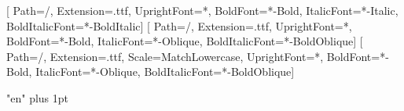 \usepackage{fontspec}
\setmainfont{DejaVuSerif}[
  Path=\fontdir/, Extension=.ttf,
  UprightFont=*, BoldFont=*-Bold, ItalicFont=*-Italic, BoldItalicFont=*-BoldItalic]
\setsansfont{DejaVuSans}[
  Path=\fontdir/, Extension=.ttf,
  UprightFont=*, BoldFont=*-Bold, ItalicFont=*-Oblique, BoldItalicFont=*-BoldOblique]
\setmonofont{DejaVuSansMono}[
  Path=\fontdir/, Extension=.ttf, Scale=MatchLowercase,
  UprightFont=*, BoldFont=*-Bold, ItalicFont=*-Oblique, BoldItalicFont=*-BoldOblique]
\usepackage{microtype}
\usepackage{xcolor}
\usepackage{fvextra}
\usepackage{framed}
\makeatletter
{}
\makeatother
{}
\XeTeXlinebreaklocale "en"
\XeTeXlinebreakskip=0pt plus 1pt
\sloppy
\usepackage{longtable,booktabs,array}
\setlength{\LTpre}{6pt}\setlength{\LTpost}{6pt}
\usepackage{etoolbox}
\usepackage{titlesec}
\titleformat{\section}{\Large\bfseries\sffamily}{\thesection}{0.6em}{}
\titleformat{\subsection}{\large\bfseries\sffamily}{\thesubsection}{0.6em}{}
